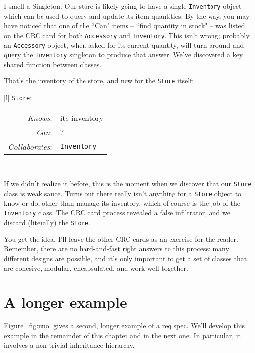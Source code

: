 I smell a Singleton. Our store is likely going to have a single
\texttt{Inventory} object which can be used to query and update its item
quantities. By the way, you may have noticed that one of the ``Can" items --
``find quantity in stock" -- was listed on the CRC card for both
\texttt{Accessory} and \texttt{Inventory}. This isn't wrong; probably an
\texttt{Accessory} object, when asked for its current quantity, will turn
around and query the \texttt{Inventory} singleton to produce that answer.
We've discovered a key shared function between classes.

That's the inventory of the store, and now for the \texttt{Store} itself:

\begin{center}
\begin{tabular}{|l|}
\hline
\texttt{Store}:\\
\hline
\begin{tabular}{rl}
\textit{Knows}: & its inventory \\
\textit{Can}: & ? \\
\hline
\textit{Collaborates}: & \texttt{Inventory} \\
\end{tabular}\\
\hline
\end{tabular}
\end{center}

If we didn't realize it before, this is the moment when we discover that our
\texttt{Store} class is weak sauce. Turns out there really isn't anything for
a \texttt{Store} object to know or do, other than manage its inventory, which
of course is the job of the \texttt{Inventory} class. The CRC card process
revealed a false infiltrator, and we discard (literally) the \texttt{Store}.

You get the idea. I'll leave the other CRC cards as an exercise for the
reader. Remember, there are no hard-and-fast right answers to this process:
many different designs are possible, and it's only important to get a set of
classes that are cohesive, modular, encapsulated, and work well together.


\vspace{3in}

\pagebreak

\section{A longer example}

Figure~\ref{fig:uno} gives a second, longer example of a req spec. We'll
develop this example in the remainder of this chapter and in the next one. In
particular, it involves a non-trivial inheritance hierarchy.

